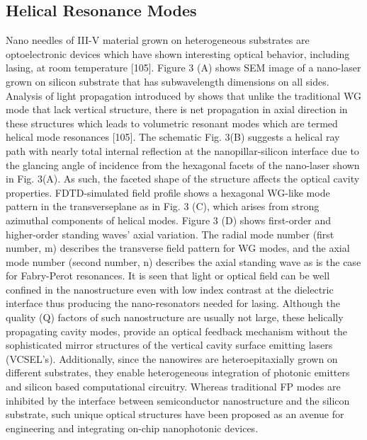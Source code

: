 \subsection{Helical Resonance Modes}
Nano needles of III-V material grown on heterogeneous substrates are optoelectronic devices which have shown interesting optical behavior, including lasing, at room temperature [105]. Figure 3 (A) shows SEM image of a nano-laser grown on silicon substrate that has subwavelength dimensions on all sides. Analysis of light propagation introduced by shows that unlike the traditional WG mode that lack vertical structure, there is net propagation in axial direction in these structures which leads to  volumetric resonant modes which are termed helical mode resonances [105]. The schematic Fig. 3(B) suggests a helical ray path with nearly total internal reflection at the nanopillar-silicon interface due to the glancing angle of incidence from the hexagonal facets of the nano-laser shown in Fig. 3(A). As such, the faceted shape of the structure affects the optical cavity properties. FDTD-simulated field profile shows a hexagonal WG-like mode pattern  in the transverseplane as in Fig. 3 (C), which arises from strong azimuthal components of helical modes. Figure 3 (D) shows first-order  and higher-order standing waves’ axial variation. The radial mode number (first number, m) describes the transverse field pattern for WG modes, and the axial mode number (second number, n) describes the axial standing wave as is the case for Fabry-Perot resonances. It is seen that light or optical field can be well confined in the nanostructure even with low index contrast at the dielectric interface thus producing the nano-resonators needed for lasing. Although the quality (Q) factors of such nanostructure are usually not large, these helically propagating cavity modes, provide an optical feedback mechanism without the sophisticated mirror structures of the vertical cavity surface emitting lasers (VCSEL’s). Additionally, since the nanowires are heteroepitaxially grown on different substrates, they enable heterogeneous integration of photonic emitters and silicon based computational circuitry.  Whereas traditional FP modes are inhibited by the interface between semiconductor nanostructure and the silicon substrate, such unique optical structures have been proposed as an avenue for engineering and integrating on-chip nanophotonic devices. 

